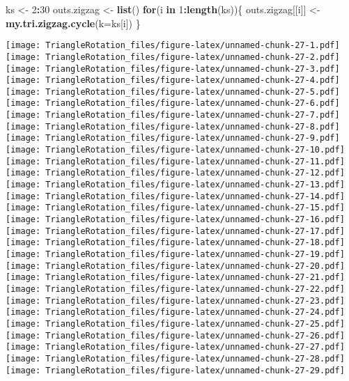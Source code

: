 \documentclass[]{article}
\newenvironment{Shaded}{\begin{snugshade}}{\end{snugshade}}
\newcommand{\KeywordTok}[1]{\textcolor[rgb]{0.13,0.29,0.53}{\textbf{#1}}}
\newcommand{\DataTypeTok}[1]{\textcolor[rgb]{0.13,0.29,0.53}{#1}}
\newcommand{\DecValTok}[1]{\textcolor[rgb]{0.00,0.00,0.81}{#1}}
\newcommand{\StringTok}[1]{\textcolor[rgb]{0.31,0.60,0.02}{#1}}
\newcommand{\ControlFlowTok}[1]{\textcolor[rgb]{0.13,0.29,0.53}{\textbf{#1}}}
\newcommand{\OperatorTok}[1]{\textcolor[rgb]{0.81,0.36,0.00}{\textbf{#1}}}
\newcommand{\NormalTok}[1]{#1}
\begin{document}
\begin{Shaded}
\begin{Highlighting}[]
\NormalTok{ks <-}\StringTok{ }\DecValTok{2}\OperatorTok{:}\DecValTok{30}
\NormalTok{outs.zigzag <-}\StringTok{ }\KeywordTok{list}\NormalTok{()}
\ControlFlowTok{for}\NormalTok{(i }\ControlFlowTok{in} \DecValTok{1}\OperatorTok{:}\KeywordTok{length}\NormalTok{(ks))\{}
\NormalTok{  outs.zigzag[[i]] <-}\StringTok{ }\KeywordTok{my.tri.zigzag.cycle}\NormalTok{(}\DataTypeTok{k=}\NormalTok{ks[i])}
\NormalTok{\}}
\end{Highlighting}
\end{Shaded}

\texttt{[image: TriangleRotation\_files/figure-latex/unnamed-chunk-27-1.pdf]}
\texttt{[image: TriangleRotation\_files/figure-latex/unnamed-chunk-27-2.pdf]}
\texttt{[image: TriangleRotation\_files/figure-latex/unnamed-chunk-27-3.pdf]}
\texttt{[image: TriangleRotation\_files/figure-latex/unnamed-chunk-27-4.pdf]}
\texttt{[image: TriangleRotation\_files/figure-latex/unnamed-chunk-27-5.pdf]}
\texttt{[image: TriangleRotation\_files/figure-latex/unnamed-chunk-27-6.pdf]}
\texttt{[image: TriangleRotation\_files/figure-latex/unnamed-chunk-27-7.pdf]}
\texttt{[image: TriangleRotation\_files/figure-latex/unnamed-chunk-27-8.pdf]}
\texttt{[image: TriangleRotation\_files/figure-latex/unnamed-chunk-27-9.pdf]}
\texttt{[image: TriangleRotation\_files/figure-latex/unnamed-chunk-27-10.pdf]}
\texttt{[image: TriangleRotation\_files/figure-latex/unnamed-chunk-27-11.pdf]}
\texttt{[image: TriangleRotation\_files/figure-latex/unnamed-chunk-27-12.pdf]}
\texttt{[image: TriangleRotation\_files/figure-latex/unnamed-chunk-27-13.pdf]}
\texttt{[image: TriangleRotation\_files/figure-latex/unnamed-chunk-27-14.pdf]}
\texttt{[image: TriangleRotation\_files/figure-latex/unnamed-chunk-27-15.pdf]}
\texttt{[image: TriangleRotation\_files/figure-latex/unnamed-chunk-27-16.pdf]}
\texttt{[image: TriangleRotation\_files/figure-latex/unnamed-chunk-27-17.pdf]}
\texttt{[image: TriangleRotation\_files/figure-latex/unnamed-chunk-27-18.pdf]}
\texttt{[image: TriangleRotation\_files/figure-latex/unnamed-chunk-27-19.pdf]}
\texttt{[image: TriangleRotation\_files/figure-latex/unnamed-chunk-27-20.pdf]}
\texttt{[image: TriangleRotation\_files/figure-latex/unnamed-chunk-27-21.pdf]}
\texttt{[image: TriangleRotation\_files/figure-latex/unnamed-chunk-27-22.pdf]}
\texttt{[image: TriangleRotation\_files/figure-latex/unnamed-chunk-27-23.pdf]}
\texttt{[image: TriangleRotation\_files/figure-latex/unnamed-chunk-27-24.pdf]}
\texttt{[image: TriangleRotation\_files/figure-latex/unnamed-chunk-27-25.pdf]}
\texttt{[image: TriangleRotation\_files/figure-latex/unnamed-chunk-27-26.pdf]}
\texttt{[image: TriangleRotation\_files/figure-latex/unnamed-chunk-27-27.pdf]}
\texttt{[image: TriangleRotation\_files/figure-latex/unnamed-chunk-27-28.pdf]}
\texttt{[image: TriangleRotation\_files/figure-latex/unnamed-chunk-27-29.pdf]}
\end{document}
